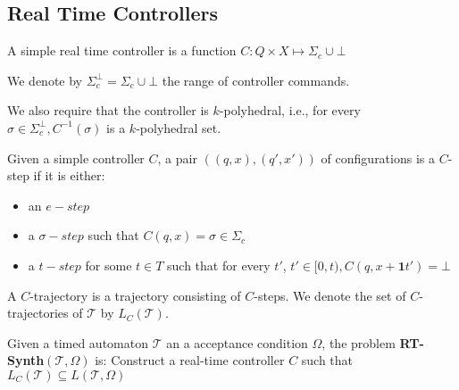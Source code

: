 \documentclass[table]{beamer}
\newcommand{\confPair}{\ensuremath{((q,x),(q',x'))}}
\begin{document}
\subsection{Real Time Controllers}
\begin{frame}
	\begin{dfn}
		A simple real time controller is a function $C: Q \times X \mapsto \Sigma_c \cup {\bot}$
	\end{dfn}

	\medskip

	We denote by $\Sigma_c^\bot = \Sigma_c \cup {\bot}$ the range of controller commands.
	
	\medskip

	We also require that the controller is $k$-polyhedral, i.e., for every $\sigma \in \Sigma_c^\bot, C^{-1}(\sigma)$ is  a $k$-polyhedral set.

\end{frame}

\begin{frame}
	\begin{dfn}
		Given a simple controller $C$, a pair $\confPair$ of configurations is a $C$-step if it is either:
		\begin{itemize}
			\item an $e-step$ 
			\item a $\sigma-step$ such that $C(q,x)=\sigma \in \Sigma_c$
			\item a $t-step$ for some $t \in T$ such that for every $t'$, $t' \in [0,t), C(q,x+\textbf{1}t')=\bot$
		\end{itemize}
	\end{dfn}
	A $C$-trajectory is a trajectory consisting of $C$-steps. We denote the set of $C$-trajectories of $\mathcal{T}$ by $L_C(\mathcal{T})$.
\end{frame}

\begin{frame}
	\begin{dfn}
		Given a timed automaton $\mathcal{T}$ an a acceptance condition $\Omega$, the problem \textbf{RT-Synth}$(\mathcal{T},\Omega)$ is: Construct a real-time controller $C$ such that $L_C(\mathcal{T})\subseteq L(\mathcal{T},\Omega)$
	\end{dfn}
\end{frame}
\end{document}
